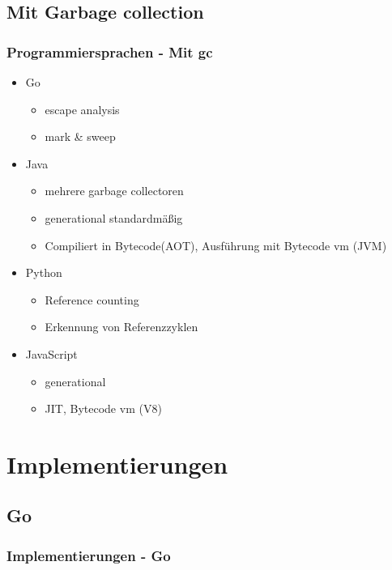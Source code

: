 \documentclass{beamer}
\begin{document}
        \subsection{Mit Garbage collection}
            \begin{frame}
                \frametitle{Programmiersprachen - Mit gc}
                \begin{itemize}
                    \item Go
                    \begin{itemize}
                        \item escape analysis
                        \item mark \& sweep
                    \end{itemize}
                    \item Java
                    \begin{itemize}
                        \item mehrere garbage collectoren
                        \item generational standardmäßig
                        \item Compiliert in Bytecode(AOT), Ausführung mit Bytecode vm (JVM)
                    \end{itemize}
                    \item Python
                    \begin{itemize}
                        \item Reference counting
                        \item Erkennung von Referenzzyklen
                    \end{itemize}
                    \item JavaScript
                    \begin{itemize}
                        \item generational
                        \item JIT, Bytecode vm (V8)
                    \end{itemize}
                \end{itemize}
            \end{frame}

    \section{Implementierungen}
        \subsection{Go}
            \begin{frame}
                \frametitle{Implementierungen - Go}
            \end{frame}
\end{document}
